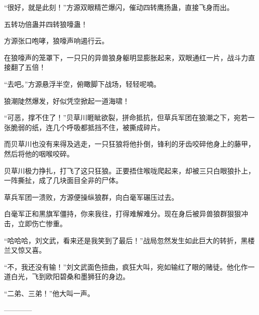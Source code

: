 \begin{this_body}
“很好，就是此刻！”方源双眼精芒爆闪，催动四转鹰扬蛊，直接飞身而出。

五转功倍蛊并四转狼嚎蛊！

方源张口咆哮，狼嚎声响遏行云。

在狼嚎声的笼罩下，一只只的异兽狼身躯明显膨胀起来，双眼通红一片，战斗力直接翻了五倍！

“去吧。”方源悬浮半空，俯瞰脚下战场，轻轻呢喃。

狼潮陡然爆发，好似凭空掀起一道海啸！

“可恶，撑不住了！”贝草川睚眦欲裂，拼命抵抗，但草兵军团在狼潮之下，宛若一张脆弱的纸，连几个呼吸都抵挡不住，被撕成碎片。

而贝草川也没有来得及逃走，一只狂狼将他扑倒，锋利的牙齿咬碎他身上的藤甲，然后将他的咽喉咬碎。

贝草川极力挣扎，打飞了这只狂狼。正要捂住喉咙爬起来，却被三只白眼狼扑上，一阵撕扯，成了几块面目全非的尸体。

草兵军团一溃败，方源便操纵狼群，向白毫军碾压过去。

白毫军正和黑旗军僵持，你来我往，打得难解难分。现在身后被异兽狼群狠狠冲击，立即伤亡惨重。

“哈哈哈，刘文武，看来还是我笑到了最后！”战局忽然发生如此巨大的转折，黑楼兰又惊又喜。

“不，我还没有输！”刘文武面色扭曲，疯狂大叫，宛如输红了眼的赌徒。他化作一道白光，飞到欧阳碧桑和墨狮狂的身边。

“二弟、三弟！”他大叫一声。

------------

\end{this_body}

